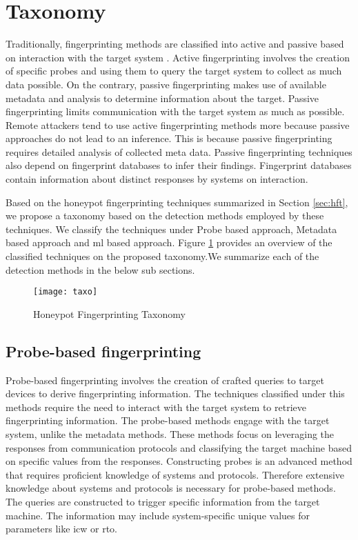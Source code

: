 \section{Taxonomy}
\label{sec:taxonomy}

Traditionally, fingerprinting methods are classified into active and passive based on interaction with the target system \cite{spitzner}. Active fingerprinting involves the creation of specific probes and using them to query the target system to collect as much data possible. On the contrary, passive fingerprinting makes use of available metadata and analysis to determine information about the target. Passive fingerprinting limits communication with the target system as much as possible. Remote attackers tend to use active fingerprinting methods more because passive approaches do not lead to an inference. This is because passive fingerprinting requires detailed analysis of collected meta data. Passive fingerprinting techniques also depend on fingerprint databases to infer their findings. Fingerprint databases contain information about distinct responses by systems on interaction.
   
Based on the honeypot fingerprinting techniques summarized in Section \ref{sec:hft}, we propose a taxonomy based on the detection methods employed by these techniques. We classify the techniques under Probe based approach, Metadata based approach and \acrlong{ml} based approach. Figure \ref{fig:taxonomy} provides an overview of the classified techniques on the proposed taxonomy.We summarize each of the detection methods in the below sub sections. 

\begin{figure}[t]
    \centering
    \texttt{[image: taxo]}
    \caption{Honeypot Fingerprinting Taxonomy}
    \label{fig:taxonomy}
\end{figure}

\subsection{Probe-based fingerprinting}
\label{Probe Based}
Probe-based fingerprinting involves the creation of crafted queries to target devices to derive fingerprinting information. The techniques classified under this methods require the need to interact with the target system to retrieve fingerprinting information. The probe-based methods engage with the target system, unlike the metadata methods. These methods focus on leveraging the responses from communication protocols and classifying the target machine based on specific values from the responses. Constructing probes is an advanced method that requires proficient knowledge of systems and protocols. Therefore extensive knowledge about systems and protocols is necessary for probe-based methods. The queries are constructed to trigger specific information from the target machine. The information may include system-specific unique values for parameters like \acrfull{icw} or \acrfull{rto}. 

